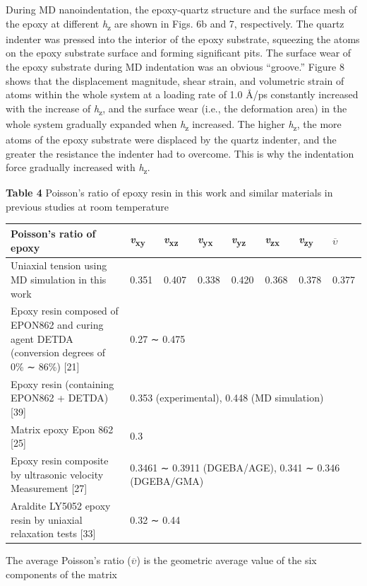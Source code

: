 \documentclass{article}
\begin{document}
During MD nanoindentation, the epoxy-quartz structure and the surface mesh of the epoxy at different \emph{h}\textsubscript{z} are shown in Figs. 6b and 7, respectively. The quartz indenter was pressed into the interior of the epoxy substrate, squeezing the atoms on the epoxy substrate surface and forming significant pits. The surface wear of the epoxy substrate during MD indentation was an obvious “groove.” Figure 8 shows that the displacement magnitude, shear strain, and volumetric strain of atoms within the whole system at a loading rate of 1.0 Å/ps constantly increased with the increase of \emph{h}\textsubscript{z}, and the surface wear (i.e., the deformation area) in the whole system gradually expanded when \emph{h}\textsubscript{z} increased. The higher \emph{h}\textsubscript{z}, the more atoms of the epoxy substrate were displaced by the quartz indenter, and the greater the resistance the indenter had to overcome. This is why the indentation force gradually increased with \emph{h}\textsubscript{z}.

\noindent\textbf{Table 4} Poisson’s ratio of epoxy resin in this work and similar materials in previous studies at room temperature
\begin{center}\footnotesize
\begin{tabular}{p{6.2cm}lllllll}
\toprule
Poisson’s ratio of epoxy & \emph{v}\textsubscript{xy} & \emph{v}\textsubscript{xz} & \emph{v}\textsubscript{yx} & \emph{v}\textsubscript{yz} & \emph{v}\textsubscript{zx} & \emph{v}\textsubscript{zy} & $\overline{\upsilon}$\\
\midrule
Uniaxial tension using MD simulation in this work & 0.351 & 0.407 & 0.338 & 0.420 & 0.368 & 0.378 & 0.377\\
Epoxy resin composed of EPON862 and curing agent DETDA (conversion degrees of 0\% ∼ 86\%) [21] & \multicolumn{7}{l}{0.27 ∼ 0.475}\\
Epoxy resin (containing EPON862 + DETDA) [39] & \multicolumn{7}{l}{0.353 (experimental), 0.448 (MD simulation)}\\
Matrix epoxy Epon 862 [25] & \multicolumn{7}{l}{0.3}\\
Epoxy resin composite by ultrasonic velocity Measurement [27] & \multicolumn{7}{p{6cm}}{0.3461 ∼ 0.3911 (DGEBA/AGE), 0.341 ∼ 0.346 (DGEBA/GMA)}\\
Araldite LY5052 epoxy resin by uniaxial relaxation tests [33] & \multicolumn{7}{l}{0.32 ∼ 0.44}\\
\bottomrule
\end{tabular}
\end{center}
{\footnotesize\noindent The average Poisson’s ratio ($\overline{\upsilon}$) is the geometric average value of the six components of the matrix\par}
\end{document}

